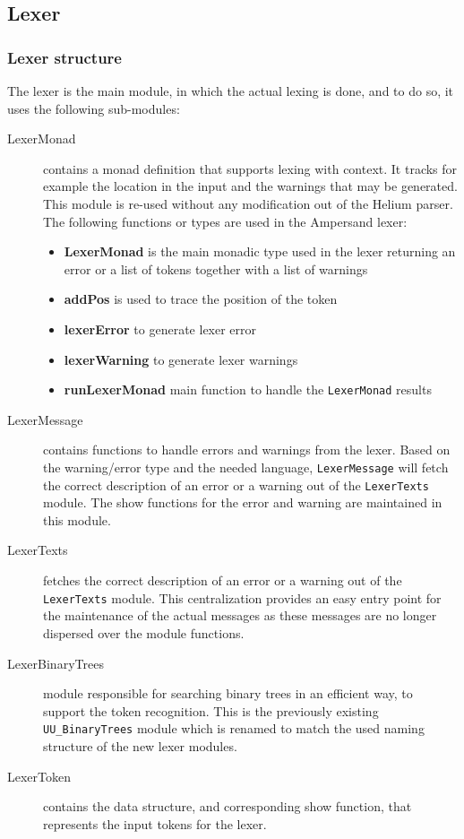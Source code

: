 
\subsection{Lexer}
\label{subsec:lexer}

\subsubsection{Lexer structure}
The lexer is the main module, in which the actual lexing is done, and to do so, it uses the following sub-modules:

 \begin{description}
 
    \item[LexerMonad] contains a monad definition that supports lexing with context.
      It tracks for example the location in the input and the warnings that may be generated.
	  This module is re-used without any modification out of the  Helium parser.
      The following functions or types are used in the Ampersand lexer:
	  \begin{itemize}
		\item \textbf{LexerMonad} is the main monadic type used in the lexer returning an error or a list of tokens together with a list of warnings
		\item \textbf{addPos} is used to trace the position of the token
		\item \textbf{lexerError} to generate lexer error
		\item \textbf{lexerWarning} to generate lexer warnings
		\item \textbf{runLexerMonad} main function to handle the \texttt{LexerMonad} results 
	  \end{itemize}
	  
    \item[LexerMessage] contains functions to handle errors and warnings from the lexer.
	  Based on the warning/error type and the needed language, \texttt{LexerMessage} will fetch the correct description of an error or a warning out of the \texttt{LexerTexts} module.
	  The show functions for the error and warning are maintained in this module.
	  
    \item[LexerTexts] fetches the correct description of an error or a warning out of the \texttt{LexerTexts} module.
	  This centralization provides an easy entry point for the maintenance of the actual messages as these messages are no longer dispersed over the module functions.
	  
    \item[LexerBinaryTrees] module responsible for searching binary trees in an efficient way, to support the token recognition.
    This is the previously existing \texttt{UU\_BinaryTrees} module which is renamed to match the used naming structure of the new lexer modules.

    \item[LexerToken] contains the data structure, and corresponding show function, that represents the input tokens for the lexer.
	
  \end{description}


